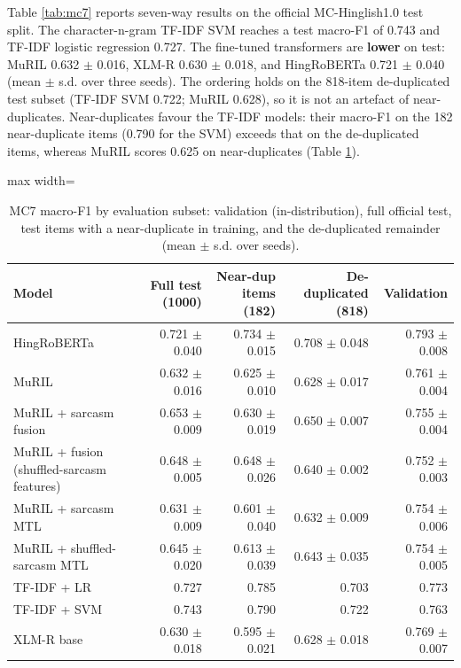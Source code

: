 \documentclass[10pt,twocolumn]{article}
\begin{document}
Table \ref{tab:mc7} reports seven-way results on the official MC-Hinglish1.0 test split. The character-n-gram TF-IDF
SVM reaches a test macro-F1 of 0.743 and TF-IDF logistic regression
0.727. The fine-tuned transformers are \textbf{lower} on test: MuRIL
0.632 $\pm$ 0.016, XLM-R
0.630 $\pm$ 0.018, and HingRoBERTa
0.721 $\pm$ 0.040 (mean $\pm$ s.d. over three
seeds). The ordering holds on the 818-item de-duplicated test subset (TF-IDF SVM
0.722; MuRIL 0.628), so it is not an
artefact of near-duplicates. Near-duplicates favour the TF-IDF models: their macro-F1 on the 182 near-duplicate items
(0.790 for the SVM) exceeds that on the de-duplicated items, whereas MuRIL scores
0.625 on near-duplicates (Table \ref{tab:subsets}).

\begin{table}[t]
\centering
\small
\caption{MC7 macro-F1 by evaluation subset: validation (in-distribution), full official test, test items with a near-duplicate in training, and the de-duplicated remainder (mean $\pm$ s.d. over seeds).}
\label{tab:subsets}
\begin{adjustbox}{max width=\textwidth}\begin{tabular}{lrrrr}
\toprule
Model & Full test (1000) & Near-dup items (182) & De-duplicated (818) & Validation \\
\midrule
HingRoBERTa & 0.721 $\pm$ 0.040 & 0.734 $\pm$ 0.015 & 0.708 $\pm$ 0.048 & 0.793 $\pm$ 0.008 \\
MuRIL & 0.632 $\pm$ 0.016 & 0.625 $\pm$ 0.010 & 0.628 $\pm$ 0.017 & 0.761 $\pm$ 0.004 \\
MuRIL + sarcasm fusion & 0.653 $\pm$ 0.009 & 0.630 $\pm$ 0.019 & 0.650 $\pm$ 0.007 & 0.755 $\pm$ 0.004 \\
MuRIL + fusion (shuffled-sarcasm features) & 0.648 $\pm$ 0.005 & 0.648 $\pm$ 0.026 & 0.640 $\pm$ 0.002 & 0.752 $\pm$ 0.003 \\
MuRIL + sarcasm MTL & 0.631 $\pm$ 0.009 & 0.601 $\pm$ 0.040 & 0.632 $\pm$ 0.009 & 0.754 $\pm$ 0.006 \\
MuRIL + shuffled-sarcasm MTL & 0.645 $\pm$ 0.020 & 0.613 $\pm$ 0.039 & 0.643 $\pm$ 0.035 & 0.754 $\pm$ 0.005 \\
TF-IDF + LR & 0.727 & 0.785 & 0.703 & 0.773 \\
TF-IDF + SVM & 0.743 & 0.790 & 0.722 & 0.763 \\
XLM-R base & 0.630 $\pm$ 0.018 & 0.595 $\pm$ 0.021 & 0.628 $\pm$ 0.018 & 0.769 $\pm$ 0.007 \\
\bottomrule
\end{tabular}\end{adjustbox}
\end{table}
\end{document}
